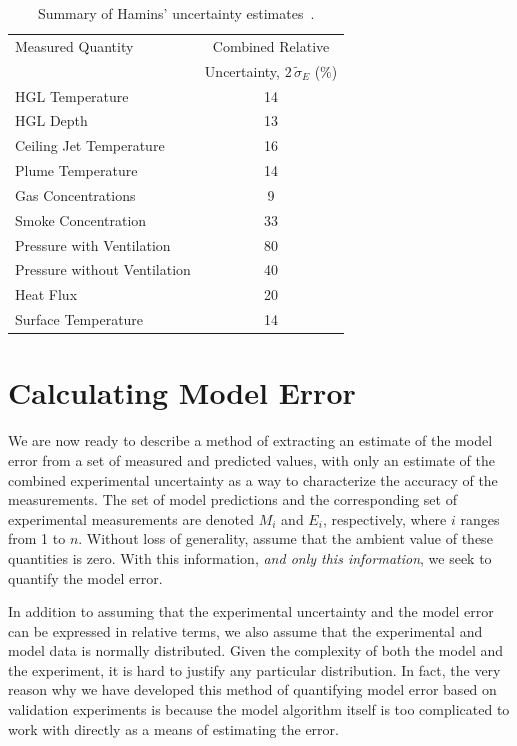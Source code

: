 \begin{table}[ht!]
\caption{Summary of Hamins' uncertainty estimates~\cite{NUREG_1824}. }
\begin{center}
\begin{tabular}{|l|c|}
\hline
Measured Quantity               & Combined Relative       \\
                                & Uncertainty, $2 \, \tilde{\sigma}_E$ (\%)       \\ \hline \hline
HGL Temperature                 & 14    \\ \hline
HGL Depth                       & 13    \\ \hline
Ceiling Jet Temperature         & 16    \\ \hline
Plume Temperature               & 14    \\ \hline
Gas Concentrations              & 9     \\ \hline
Smoke Concentration             & 33    \\ \hline
Pressure with Ventilation       & 80    \\ \hline
Pressure without Ventilation    & 40    \\ \hline
Heat Flux                       & 20    \\ \hline
Surface Temperature             & 14    \\ \hline
\end{tabular}
\end{center}
\label{Uncertainty}
\end{table}


\section{Calculating Model Error}

We are now ready to describe a method of extracting an estimate of the model error from a set of measured and predicted values, with only an estimate of
the combined experimental uncertainty as a way to characterize the accuracy of the measurements.
The set of model predictions and the corresponding set of experimental measurements are denoted
$M_i$ and $E_i$, respectively, where $i$ ranges from 1 to $n$. Without loss of generality, assume that the
ambient value of these quantities is zero. With this information, {\em and only this information}, we seek to quantify the model error.

In addition to assuming that the experimental uncertainty and the model error can be expressed in relative terms, we also assume that
the experimental and model data is normally distributed. Given the complexity of both the model and the experiment, it is hard to justify
any particular distribution. In fact, the very reason why we have developed this method of quantifying model error based on validation
experiments is because the model algorithm itself is too complicated to work with directly as a means of estimating the error.

